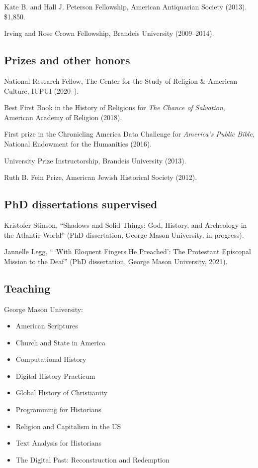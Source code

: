 \documentclass[11pt]{article}
\providecommand{\tightlist}{%
  \setlength{\itemsep}{0pt}\setlength{\parskip}{0pt}}
\begin{document}
Kate B. and Hall J. Peterson Fellowship, American Antiquarian Society (2013). \$1,850.

Irving and Rose Crown Fellowship, Brandeis University (2009--2014).

\subsection{Prizes and other honors}\label{Prizes}

National Research Fellow, The Center for the Study of Religion \& American Culture, IUPUI (2020--).

Best First Book in the History of Religions for \emph{The Chance of Salvation}, American Academy of Religion (2018).

First prize in the Chronicling America Data Challenge for \emph{America's Public Bible}, National Endowment for the Humanities (2016).

University Prize Instructorship, Brandeis University (2013).

Ruth B. Fein Prize, American Jewish Historical Society (2012). 

\subsection{PhD dissertations supervised}\label{Dissertations supervised}

Kristofer Stinson, ``Shadows and Solid Things: God, History, and Archeology in the Atlantic World'' (PhD dissertation, George Mason University, in progress).

Jannelle Legg, ``\,`With Eloquent Fingers He Preached': The Protestant Episcopal Mission to the Deaf'' (PhD dissertation, George Mason University, 2021).

\subsection{Teaching}\label{Teaching}

George Mason University:

\vspace{-0.15in}

\begin{itemize}
    \tightlist
  \item American Scriptures 
  \item Church and State in America
  \item Computational History 
  \item Digital History Practicum
  \item Global History of Christianity 
  \item Programming for Historians 
  \item Religion and Capitalism in the US 
  \item Text Analysis for Historians 
  \item The Digital Past: Reconstruction and Redemption
\end{itemize}
\end{document}
